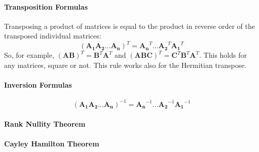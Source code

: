 \paragraph{Transposition Formulas}
Transposing a product of matrices is equal to the product in reverse order of the transposed individual matrices:
\begin{equation}
(\mathbf{A_1 A_2 \ldots  A_n})^T = \mathbf{A_n}^T \ldots \mathbf{A_2}^T \mathbf{A_1}^T
\end{equation}
So, for example, $(\mathbf{A} \mathbf{B})^T =  \mathbf{B}^T \mathbf{A}^T$ and  $(\mathbf{A} \mathbf{B} \mathbf{C})^T = \mathbf{C}^T \mathbf{B}^T  \mathbf{A}^T$. This holds for any matrices, square or not. This rule works also for the Hermitian transpose.


\paragraph{Inversion Formulas}
\begin{equation}
(\mathbf{A_1 A_2 \ldots  A_n})^{-1} = \mathbf{A_n}^{-1} \ldots \mathbf{A_2}^{-1} \mathbf{A_1}^{-1}
\end{equation}





\paragraph{Rank Nullity Theorem}


\paragraph{Cayley Hamilton Theorem}


